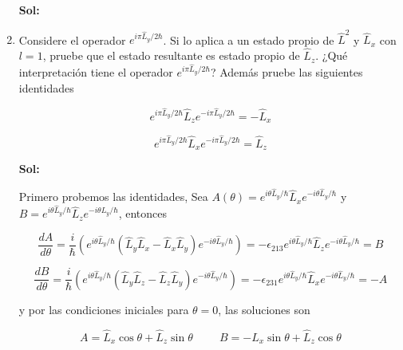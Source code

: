 \documentclass[12pt,a4paper]{article}
\begin{document}
\begin{enumerate}
\textbf{Sol:}






\item Considere el operador $e^{i \pi \hat{L}_{y} / 2 \hbar}$. Si lo aplica a un estado propio de $\hat{L}^2$ y $\hat{L}_{x}$ con $l = 1$, pruebe que el estado resultante es estado propio de $\hat{L}_{z}$. ¿Qué interpretación tiene el operador $e^{i\pi \hat{L}_{y}/2 \hbar}$? Además pruebe las siguientes identidades

\begin{equation*}
    e^{i\pi \hat{L}_{y}/2 \hbar} \hat{L}_{z} e^{-i\pi \hat{L}_{y}/2\hbar} = - \hat{L}_{x}
\end{equation*}

\begin{equation*}
    e^{i\pi \hat{L}_{y}/2 \hbar} \hat{L}_{x} e^{-i\pi \hat{L}_{y}/2 \hbar} = \hat{L}_{z}
\end{equation*}

\textbf{Sol:} 

Primero probemos las identidades, Sea $A(\theta) =e^{i\theta \hat{L}_{y}/ \hbar} \hat{L}_{x} e^{-i\theta \hat{L}_{y}/ \hbar}$ y $B = e^{i\theta \hat{L}_{y}/ \hbar} \hat{L}_{z} e^{-i\theta \hat{L}_{y}/\hbar} $, entonces

\begin{equation*}
    \frac{d A}{d \theta} = \frac{i}{\hbar} (e^{i\theta \hat{L}_{y}/\hbar}(\hat{L}_{y}\hat{L}_{x} - \hat{L}_{x}\hat{L}_{y})e^{-i\theta \hat{L}_{y}/\hbar}) = - \epsilon_{213} e^{i\theta \hat{L}_{y}/\hbar} \hat{L}_{z}e^{-i\theta \hat{L}_{y}/\hbar} = B
\end{equation*}

\begin{equation*}
    \frac{d B}{d \theta} = \frac{i}{\hbar} (e^{i\theta \hat{L}_{y}/\hbar}(\hat{L}_{y}\hat{L}_{z} - \hat{L}_{z}\hat{L}_{y})e^{-i\theta \hat{L}_{y}/\hbar}) = - \epsilon_{231} e^{i\theta \hat{L}_{y}/\hbar} \hat{L}_{x}e^{-i\theta \hat{L}_{y}/\hbar} = -A
\end{equation*}

 y por las condiciones iniciales para $\theta = 0$, las soluciones son
 
 \begin{equation*}
     A = \hat{L}_{x} \cos{\theta} + \hat{L}_{z} \sin{\theta} \hspace{1cm}  B = -\hat{L}_{x} \sin{\theta} + \hat{L}_{z} \cos{\theta}
 \end{equation*}
 

\end{enumerate}
\end{document}
